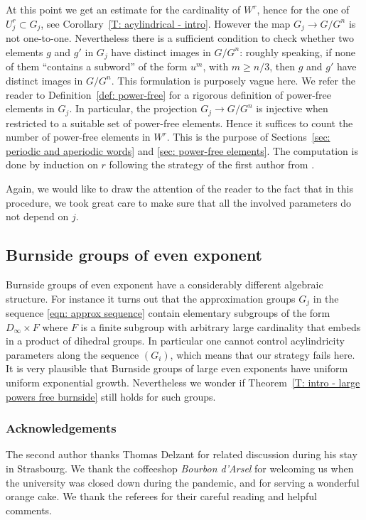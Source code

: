 \documentclass[JEP,XML,SOM,Unicode, NoEqCountersInSection,published]{cedram}
\theoremstyle{plain}
\theoremstyle{definition}
\begin{document}
At this point we get an estimate for the cardinality of $W^r$, hence for the one of $U_j^r\subset G_j$, see Corollary~\ref{T: acylindrical - intro}.
However the map $G_j \to G/G^n$ is not one-to-one.
Nevertheless there is a sufficient condition to check whether two elements $g$ and $g'$ in $G_j$ have distinct images in $G/G^n$: roughly speaking, if none of them ``contains a subword'' of the form $u^m$, with $m \geq n/3$, then $g$ and $g'$ have distinct images in $G/G^n$.
This formulation is purposely vague here.
We refer the reader to Definition~\ref{def: power-free} for a rigorous definition of power-free elements in $G_j$.
In particular, the projection $G_j \to G/G^n$ is injective when restricted to a suitable set of power-free elements.
Hence it suffices to count the number of power-free elements in $W^r$.
This is the purpose of Sections~\ref{sec: periodic and aperiodic words} and \ref{sec: power-free elements}.
The computation is done by induction on $r$ following the strategy of the first author from \cite{coulon_growth_2013}.

Again, we would like to draw the attention of the reader to the fact that in this procedure, we took great care to make sure that all the involved parameters do not depend on $j$.

\subsection{Burnside groups of even exponent}
\label{sec: discussion-even-exp}
Burnside groups of even exponent have a considerably different algebraic structure.
For instance it turns out that the approximation groups $G_j$ in the sequence \eqref{eqn: approx sequence} contain elementary subgroups of the form $D_\infty \times F$ where $F$ is a finite subgroup with arbitrary large cardinality that embeds in a product of dihedral groups.
In particular one cannot control acylindricity parameters along the sequence $(G_i)$, which means that our strategy fails here.
It is very plausible that Burnside groups of large even exponents have uniform uniform exponential growth.
Nevertheless we wonder if Theorem~\ref{T: intro - large powers free burnside} still holds for such groups.

\subsubsection*{Acknowledgements}
The second author thanks Thomas Delzant for related discussion during his stay in Strasbourg. We thank the coffeeshop \emph{Bourbon d'Arsel} for welcoming us when the university was closed down during the pandemic, and for serving a wonderful orange cake. We thank the referees for their careful reading and helpful comments.
\end{document}
